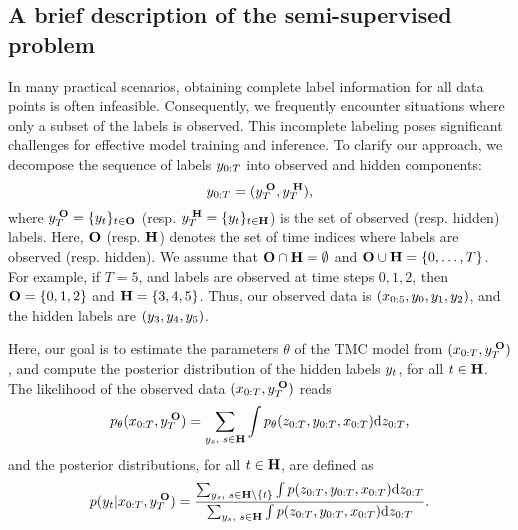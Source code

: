 \subsection{A brief description of the semi-supervised problem}
In many practical scenarios, obtaining complete label information for all data
points is often infeasible. Consequently, we frequently encounter 
situations where only a
subset of the labels is observed. This incomplete labeling poses significant
challenges for effective model training and inference.  
To clarify our approach, we decompose the sequence of labels  
$y_{0:T}$ into observed and hidden components:
$$y_{0:T}  = (y_{T}^{\;\mathbf{O}}, y_{T}^{\;\mathbf{H}}) \text{,}$$ 
where $y_{T}^{\;\mathbf{O}}=\{y_t\}_{t\in \mathbf{O}}$  (resp. $y_{T}^{\;\mathbf{H}}=\{y_t\}_{t\in \mathbf{H}}$) 
is the set of observed (resp. hidden) labels.
Here,  $\mathbf{O}$ (resp. $\mathbf{H}$) denotes the set of time indices where labels are 
observed (resp. hidden).
We assume that $\mathbf{O} \cap \mathbf{H} = \emptyset$ and $\mathbf{O} \cup \mathbf{H} = \{0,\dots,T\}$.
For example, if $T=5$, and labels are observed at time steps $0,1,2$, 
then $\mathbf{O}=\{0,1,2\}$ and $\mathbf{H}=\{3,4,5\}$.
Thus, our observed data is  $(x_{0:5}, y_0, y_1, y_2)$, and 
the hidden labels are $(y_3, y_4, y_5)$.



Here, our goal is to estimate the parameters $\theta$  of the TMC model
from  $(x_{0:T},y_{T}^{\;\mathbf{O}})$,
and compute the posterior distribution of the hidden labels $y_t$,
for all $t \in \mathbf{H}$. 
The likelihood of the observed data $(x_{0:T},y_{T}^{\;\mathbf{O}})$ reads
\begin{align}
    \label{eq:likelihood_semi}
    p_{\theta}(x_{0:T}, y_{T}^{\;\mathbf{O}})=\sum_{y_s \text{, }  s \in \mathbf{H}} 
    \int p_{\theta}(z_{0:T},y_{0:T},x_{0:T}) {\rm d}z_{0:T} \text{,}
\end{align}
and the posterior distributions, for all $t \in \mathbf{H}$, are defined as 
\begin{align}
    \label{eq:post_distrib_semi}
    p(y_t|x_{0:T},y_{T}^{\;\mathbf{O}})=\frac{\sum_{y_s \text{, }  
    s \in \mathbf{H} \backslash \{t\}} \int 
    p(z_{0:T},y_{0:T},x_{0:T}) {\rm d}z_{0:T}  } 
    { \sum_{y_s \text{, }  s \in \mathbf{H}} \int p(z_{0:T},y_{0:T},x_{0:T}) {\rm d}z_{0:T}} 
    \text{.}
\end{align}


